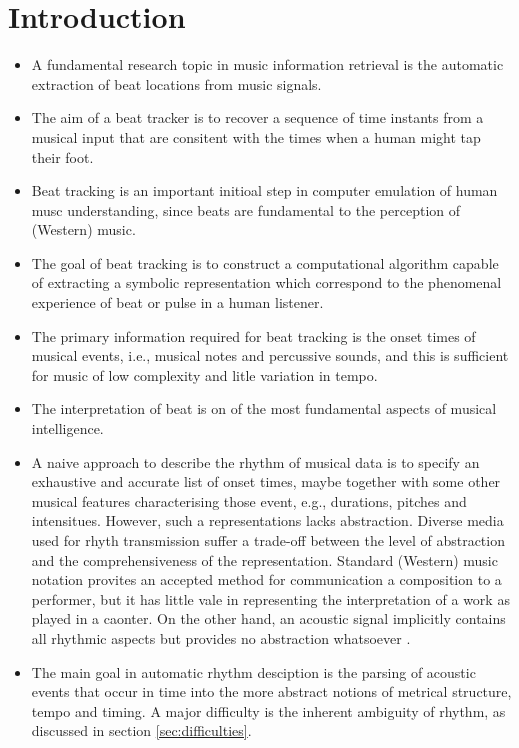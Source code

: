 \documentclass{scrartcl}
\begin{document}
\pagestyle{empty}


\tableofcontents
\newpage


\section{Introduction}

\begin{itemize}
\item A fundamental research topic in music information retrieval is the automatic extraction of beat locations from music signals. 
\item The aim of a beat tracker is to recover a sequence of time instants from a musical input that are consitent with the times when a human might tap their foot. \cite{Ellis2007}
\item Beat tracking is an important initioal step in computer emulation of human musc understanding, since beats are fundamental to the perception of (Western) music.
\item The goal of beat tracking is to construct a computational algorithm capable of extracting a symbolic representation which correspond to the phenomenal experience of beat or pulse in a human listener.
\item The primary information required for beat tracking is the onset times of musical events, i.e., musical notes and percussive sounds, and this is sufficient for music of low complexity and litle variation in tempo.
\item The interpretation of beat is on of the most fundamental aspects of musical intelligence.
\item A naive approach to describe the rhythm of musical data is to specify an exhaustive and accurate list of onset times, maybe together with some other musical features characterising those event, e.g., durations, pitches and intensitues. However, such a representations lacks abstraction. Diverse media used for rhyth transmission suffer a trade-off between the level of abstraction and the comprehensiveness of the representation. Standard (Western) music notation provites an accepted method for communication a composition to a performer, but it has little vale in representing the interpretation of a work as played in a caonter. On the other hand, an acoustic signal implicitly contains all rhythmic aspects but provides no abstraction whatsoever \cite{Gouyon2005}.
\item The main goal in automatic rhythm desciption is the parsing of acoustic events that occur in time into the more abstract notions of metrical structure, tempo and timing. A major difficulty is the inherent ambiguity of rhythm, as discussed in section \ref{sec:difficulties}.

\end{itemize}
\end{document}
